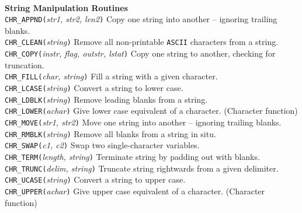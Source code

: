 \begin{tabbing}
\\
{\bf String Manipulation Routines}\\
 {{\tt{CHR\_APPND(}}{\em str1, str2, len2}{\tt )}}\>
 Copy one string into another -- ignoring trailing blanks.\\
 {{\tt{CHR\_CLEAN(}}{\em string}{\tt )}}\>
 Remove all non-printable {\tt{ASCII}} characters from a string.\\
 {{\tt{CHR\_COPY(}}{\em instr, flag, outstr, lstat}{\tt )}}\>
 Copy one string to another, checking for truncation.\\
 {{\tt{CHR\_FILL(}}{\em char, string}{\tt )}}\>
 Fill a string with a given character.\\
 {{\tt{CHR\_LCASE(}}{\em string}{\tt )}}\>
 Convert a string to lower case.\\
 {{\tt{CHR\_LDBLK(}}{\em string}{\tt )}}\>
 Remove leading blanks from a string.\\
 {{\tt{CHR\_LOWER(}}{\em achar}{\tt )}}\>
 Give lower case equivalent of a character. (Character function)\\
 {{\tt{CHR\_MOVE(}}{\em str1, str2}{\tt )}}\>
 Move one string into another -- ignoring trailing blanks.\\
 {{\tt{CHR\_RMBLK(}}{\em string}{\tt )}}\>
 Remove all blanks from a string in situ.\\
 {{\tt{CHR\_SWAP(}}{\em c1, c2}{\tt )}}\>
 Swap two single-character variables.\\
 {{\tt{CHR\_TERM(}}{\em length, string}{\tt )}}\>
 Terminate string by padding out with blanks.\\
 {{\tt{CHR\_TRUNC(}}{\em delim, string}{\tt )}}\>
 Truncate string rightwards from a given delimiter.\\
 {{\tt{CHR\_UCASE(}}{\em string}{\tt )}}\>
 Convert a string to upper case.\\
 {{\tt{CHR\_UPPER(}}{\em achar}{\tt )}}\>
 Give upper case equivalent of a character. (Character function)
\end{tabbing}

